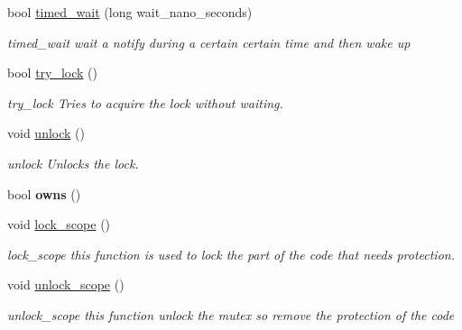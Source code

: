 \begin{DoxyCompactItemize}
bool \hyperlink{classshared__memory_1_1LockedConditionVariable_a0d4ab218fc51fcce34146f2adca408d7}{timed\+\_\+wait} (long wait\+\_\+nano\+\_\+seconds)
\begin{DoxyCompactList}\small\item\em timed\+\_\+wait wait a notify during a certain certain time and then wake up \end{DoxyCompactList}\item 
bool \hyperlink{classshared__memory_1_1LockedConditionVariable_a86b42b23b94593bca5b12b9d792d1275}{try\+\_\+lock} ()
\begin{DoxyCompactList}\small\item\em try\+\_\+lock Tries to acquire the lock without waiting. \end{DoxyCompactList}\item 
void \hyperlink{classshared__memory_1_1LockedConditionVariable_a5d28bb5942fc5bc4886014d6b9b26885}{unlock} ()
\begin{DoxyCompactList}\small\item\em unlock Unlocks the lock. \end{DoxyCompactList}\item 
\mbox{\label{classshared__memory_1_1LockedConditionVariable_a30e3825249516387276801f8d2e68a8e}} 
bool {\bfseries owns} ()
\item 
void \hyperlink{classshared__memory_1_1LockedConditionVariable_a1eef63f7e3e898c3734923c987383ffe}{lock\+\_\+scope} ()
\begin{DoxyCompactList}\small\item\em lock\+\_\+scope this function is used to lock the part of the code that needs protection. \end{DoxyCompactList}\item 
\mbox{\label{classshared__memory_1_1LockedConditionVariable_adf3a50665011b3b92b80369bbbc6d4a4}} 
void \hyperlink{classshared__memory_1_1LockedConditionVariable_adf3a50665011b3b92b80369bbbc6d4a4}{unlock\+\_\+scope} ()
\begin{DoxyCompactList}\small\item\em unlock\+\_\+scope this function unlock the mutex so remove the protection of the code \end{DoxyCompactList}\end{DoxyCompactItemize}

